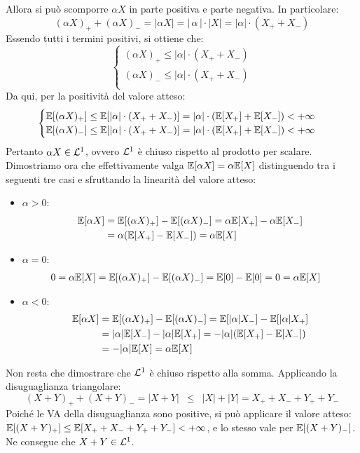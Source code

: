 \begin{dimo}
\begin{enumerate}
  Allora si può scomporre $\alpha X$ in parte positiva e parte negativa.
  In particolare:
  $$(\alpha X)_+ + (\alpha X)_- = |\alpha X| = |\,\alpha\,| \cdot |X|
    = |\alpha| \cdot (X_+ + X_-)$$
  Essendo tutti i termini positivi, si ottiene che:
  $$
    \begin{cases}
      (\alpha X)_+ \le |\alpha| \cdot (X_+ + X_-) \\
      (\alpha X)_- \le |\alpha| \cdot (X_+ + X_-) \\
    \end{cases}
  $$
  Da qui, per la positività del valore atteso:
  $$
    \begin{cases}
      \mathbb E[(\alpha X)_+] \le \mathbb E[|\alpha| \cdot (X_+ + X_-)]
        = |\alpha| \cdot (\mathbb E[X_+] + \mathbb E[X_-]) < +\infty \\
      \mathbb E[(\alpha X)_-] \le \mathbb E[|\alpha| \cdot (X_+ + X_-)]
        = |\alpha| \cdot (\mathbb E[X_+] + \mathbb E[X_-]) < +\infty \\
    \end{cases}
  $$
  Pertanto $\alpha X \in \mathcal L^1$, ovvero $\mathcal L^1$ è chiuso rispetto al prodotto
  per scalare.\\
  Dimostriamo ora che effettivamente valga $\mathbb E[\alpha X] = \alpha \mathbb E[X]$ distinguendo tra i seguenti tre casi e sfruttando la linearità del valore atteso:
	\begin{itemize}
    \item $\alpha > 0$:
		\begin{align*}
		\mathbb E[\alpha X]
	     &= \mathbb E[(\alpha X)_+] - \mathbb E[(\alpha X)_-]
	     = \alpha \mathbb E[X_+] - \alpha \mathbb E[X_-]\\
	     &= \alpha(\mathbb E[X_+] - \mathbb E[X_-])
	     = \alpha \mathbb E[X]
		 \end{align*}
		 \item $\alpha = 0$:
		 \begin{align*}
			 0 &= \alpha \mathbb E[X]
	     = \mathbb E[(\alpha X)_+] - \mathbb E[(\alpha X)_-]
	     = \mathbb E[0] - \mathbb E[0]
	     = 0
	     = \alpha \mathbb E[X]
		 \end{align*}
     \item $\alpha < 0$:
		 \begin{align*}
			 \mathbb E[\alpha X]
	     &= \mathbb E[(\alpha X)_+] - \mathbb E[(\alpha X)_-]
	     = \mathbb E[\lvert\alpha\rvert X_-] - \mathbb E[\lvert\alpha\rvert X_+]\\
	     &= \lvert\alpha\rvert \mathbb E[X_-] - \lvert\alpha\rvert \mathbb E[X_+]
			 = -\lvert\alpha\rvert (\mathbb E[X_+]-\mathbb E[X_-])\\
	     &= -\lvert\alpha\rvert \mathbb E[X]
	     = \alpha \mathbb E[X]
	  \end{align*}
	\end{itemize}
  Non resta che dimostrare che $\mathcal L^1$ è chiuso rispetto alla somma.
  Applicando la disuguaglianza triangolare:
  $$(X+Y)_+ + (X+Y)_- = |X+Y| \enspace \le \enspace |X| + |Y| = X_+ + X_- + Y_+ + Y_-$$
	Poiché le VA della disuguaglianza sono positive, si può applicare il valore atteso: $\mathbb E[(X+Y)_+] \le \mathbb E[X_+ + X_- + Y_+ + Y_-] < +\infty$, e lo stesso vale per $\mathbb E[(X+Y)_-]$.
	Ne consegue che $X + Y \in \mathcal L^1$.


\end{enumerate}
\end{dimo}
